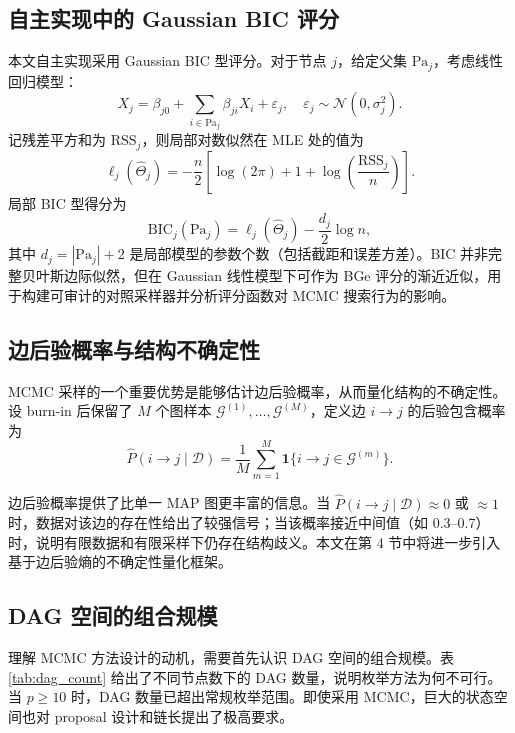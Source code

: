 \documentclass[UTF8,a4paper,12pt]{ctexart}
\begin{document}
\subsection{自主实现中的 Gaussian BIC 评分}

本文自主实现采用 Gaussian BIC 型评分。对于节点 $j$，给定父集 $\mathrm{Pa}_j$，考虑线性回归模型：
\begin{equation}
X_j = \beta_{j0} + \sum_{i \in \mathrm{Pa}_j} \beta_{ji} X_i + \varepsilon_j, \quad \varepsilon_j \sim \mathcal{N}(0, \sigma_j^2).
\end{equation}
记残差平方和为 $\mathrm{RSS}_j$，则局部对数似然在 MLE 处的值为
\begin{equation}
\ell_j(\hat{\Theta}_j) = -\frac{n}{2}\left[\log(2\pi) + 1 + \log\left(\frac{\mathrm{RSS}_j}{n}\right)\right].
\end{equation}
局部 BIC 型得分为
\begin{equation}
\mathrm{BIC}_j(\mathrm{Pa}_j) = \ell_j(\hat{\Theta}_j) - \frac{d_j}{2}\log n,
\end{equation}
其中 $d_j = |\mathrm{Pa}_j| + 2$ 是局部模型的参数个数（包括截距和误差方差）。BIC 并非完整贝叶斯边际似然，但在 Gaussian 线性模型下可作为 BGe 评分的渐近近似，用于构建可审计的对照采样器并分析评分函数对 MCMC 搜索行为的影响。

\subsection{边后验概率与结构不确定性}

MCMC 采样的一个重要优势是能够估计边后验概率，从而量化结构的不确定性。设 burn-in 后保留了 $M$ 个图样本 $\mathcal{G}^{(1)}, \ldots, \mathcal{G}^{(M)}$，定义边 $i \to j$ 的后验包含概率为
\begin{equation}\label{eq:edgepost}
\hat{P}(i \to j \mid \mathcal{D}) = \frac{1}{M} \sum_{m=1}^{M} \mathbf{1}\{i \to j \in \mathcal{G}^{(m)}\}.
\end{equation}

边后验概率提供了比单一 MAP 图更丰富的信息。当 $\hat{P}(i \to j \mid \mathcal{D}) \approx 0$ 或 $\approx 1$ 时，数据对该边的存在性给出了较强信号；当该概率接近中间值（如 0.3--0.7）时，说明有限数据和有限采样下仍存在结构歧义。本文在第 4 节中将进一步引入基于边后验熵的不确定性量化框架。

\subsection{DAG 空间的组合规模}

理解 MCMC 方法设计的动机，需要首先认识 DAG 空间的组合规模。表 \ref{tab:dag_count} 给出了不同节点数下的 DAG 数量，说明枚举方法为何不可行。当 $p \geq 10$ 时，DAG 数量已超出常规枚举范围。即使采用 MCMC，巨大的状态空间也对 proposal 设计和链长提出了极高要求。
\end{document}
